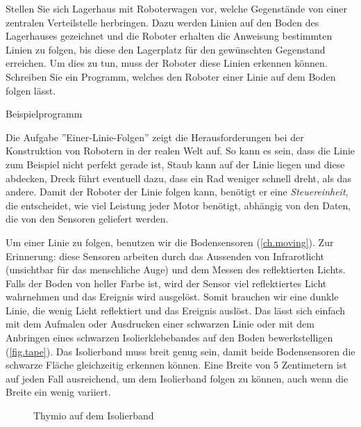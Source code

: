 \label{ch.line}

Stellen Sie sich Lagerhaus mit Roboterwagen vor, welche Gegenstände von einer zentralen Verteilstelle herbringen. Dazu werden Linien auf den Boden des Lagerhauses gezeichnet und die Roboter erhalten die Anweisung bestimmten Linien zu folgen, bis diese den Lagerplatz für den gewünschten Gegenstand erreichen. Um dies zu tun, muss der Roboter diese Linien erkennen können. Schreiben Sie ein Programm, welches den Roboter einer Linie auf dem Boden folgen lässt.

{\raggedleft \hfill Beispielprogramm }

Die Aufgabe ''Einer-Linie-Folgen'' zeigt die Herausforderungen bei der Konstruktion von Robotern in der realen Welt auf. So kann es sein, dass die Linie zum Beispiel nicht perfekt gerade ist, Staub kann auf der Linie liegen und diese abdecken, Dreck führt eventuell dazu, dass ein Rad weniger schnell dreht, als das andere. Damit der Roboter der Linie folgen kann, benötigt er eine \emph{Steuereinheit}, die entscheidet, wie viel Leistung jeder Motor benötigt, abhängig von den Daten, die von den Sensoren geliefert werden.


Um einer Linie zu folgen, benutzen wir die Bodensensoren (\cref{ch.moving}). Zur Erinnerung: diese Sensoren arbeiten durch das Aussenden von Infrarotlicht (unsichtbar für das menschliche Auge) und dem Messen des reflektierten Lichts. Falls der Boden von heller Farbe ist, wird der Sensor viel reflektiertes Licht wahrnehmen und das Ereignis  wird ausgelöst. Somit brauchen wir eine dunkle Linie, die wenig Licht reflektiert und das Ereignis  auslöst. Das lässt sich einfach mit dem Aufmalen oder Ausdrucken einer schwarzen Linie oder mit dem Anbringen eines schwarzen Isolierklebebandes auf den Boden bewerkstelligen (\cref{fig.tape}). Das Isolierband muss breit genug sein, damit beide Bodensensoren die schwarze Fläche gleichzeitig erkennen können. Eine Breite von 5 Zentimetern ist auf jeden Fall ausreichend, um dem Isolierband folgen zu können, auch wenn die Breite ein wenig variiert.

\begin{figure}
\hfill
{}
\caption{Thymio auf dem Isolierband}
\end{figure}

